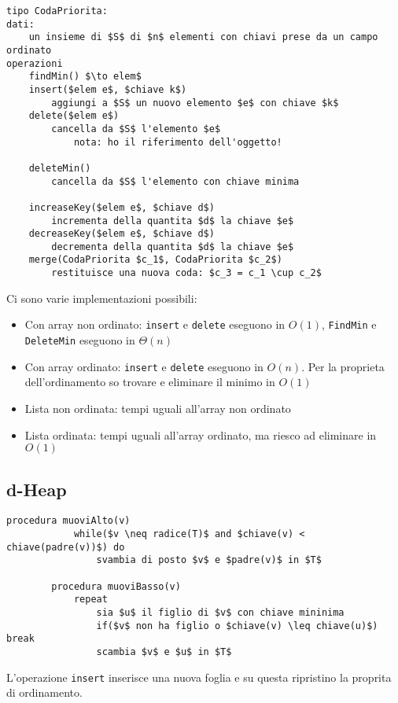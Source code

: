 
\begin{lstlisting}[mathescape=True]
tipo CodaPriorita:
dati:
    un insieme di $S$ di $n$ elementi con chiavi prese da un campo ordinato
operazioni
    findMin() $\to elem$
    insert($elem e$, $chiave k$)
        aggiungi a $S$ un nuovo elemento $e$ con chiave $k$
    delete($elem e$)
        cancella da $S$ l'elemento $e$ 
            nota: ho il riferimento dell'oggetto!

    deleteMin()
        cancella da $S$ l'elemento con chiave minima
    
    increaseKey($elem e$, $chiave d$)
        incrementa della quantita $d$ la chiave $e$
    decreaseKey($elem e$, $chiave d$)
        decrementa della quantita $d$ la chiave $e$
    merge(CodaPriorita $c_1$, CodaPriorita $c_2$)
        restituisce una nuova coda: $c_3 = c_1 \cup c_2$
\end{lstlisting}

Ci sono varie implementazioni possibili: 
\begin{itemize}
    \item Con array non ordinato:  \texttt{insert} e \texttt{delete} eseguono in $O(1)$, \texttt{FindMin} e \texttt{DeleteMin} eseguono in $\Theta(n)$
    \item Con array ordinato: \texttt{insert} e \texttt{delete} eseguono in $O(n)$. Per la proprieta dell'ordinamento so trovare e eliminare il minimo in $O(1)$
    \item Lista non ordinata: tempi uguali all'array non ordinato
    \item Lista ordinata: tempi uguali all'array ordinato, ma riesco ad eliminare in $O(1)$
\end{itemize}

\subsection{d-Heap}
    \begin{lstlisting}[mathescape=true]
        procedura muoviAlto(v)
            while($v \neq radice(T)$ and $chiave(v) < chiave(padre(v))$) do
                svambia di posto $v$ e $padre(v)$ in $T$
            
        procedura muoviBasso(v)
            repeat
                sia $u$ il figlio di $v$ con chiave mininima
                if($v$ non ha figlio o $chiave(v) \leq chiave(u)$) break
                scambia $v$ e $u$ in $T$
    \end{lstlisting}

    L'operazione \texttt{insert} inserisce una nuova foglia e su questa ripristino la proprita di ordinamento. \\

